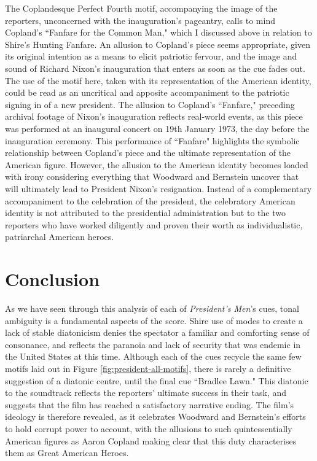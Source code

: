 The Coplandesque Perfect Fourth motif, accompanying the image of the reporters, unconcerned with the inauguration's pageantry, calls to mind Copland's ``Fanfare for the Common Man," which I discussed above in relation to Shire's Hunting Fanfare.
An allusion to Copland's piece seems appropriate, given its original intention as a means to elicit patriotic fervour, and the image and sound of Richard Nixon's inauguration that enters as soon as the cue fades out.
The use of the motif here, taken with its representation of the American identity, could be read as an uncritical and apposite accompaniment to the patriotic signing in of a new president.
The allusion to Copland's ``Fanfare," preceding archival footage of Nixon's inauguration reflects real-world events, as this piece was performed at an inaugural concert on 19th January 1973, the day before the inauguration ceremony.\autocites[Michael Chikinda has noted that before ``Fanfare for the Common Man" was confirmed to be performed, organisers considered a performance of another Copland piece, ``Lincoln Portrait." However, this other piece was rejected, likely due, Chikinda argues, to the piece's recitation of a portion of President Lincoln's Gettysburg Address in which he lamented the number of casualties in the American Civil War. Given that the Vietnam War was still ongoing, Chikinda writes that Lincoln's speech possibly ``touched a nerve."][7-8]{chikinda_lincoln_2018}
This performance of ``Fanfare" highlights the symbolic relationship between Copland's piece and the ultimate representation of the American figure.
However, the allusion to the American identity becomes loaded with irony considering everything that Woodward and Bernstein uncover that will ultimately lead to President Nixon's resignation.
Instead of a complementary accompaniment to the celebration of the president, the celebratory American identity is not attributed to the presidential administration but to the two reporters who have worked diligently and proven their worth as individualistic, patriarchal American heroes.

\section{Conclusion}

As we have seen through this analysis of each of \textit{President's Men}'s cues, tonal ambiguity is a fundamental aspects of the score.
Shire use of modes to create a lack of stable diatonicism denies the spectator a familiar and comforting sense of consonance, and reflects the paranoia and lack of security that was endemic in the United States at this time.
Although each of the cues recycle the same few motifs laid out in Figure \ref{fig:president-all-motifs}, there is rarely a definitive suggestion of a diatonic centre, until the final cue ``Bradlee Lawn."
This diatonic to the soundtrack reflects the reporters' ultimate success in their task, and suggests that the film has reached a satisfactory narrative ending.
The film's ideology is therefore revealed, as it celebrates Woodward and Bernstein's efforts to hold corrupt power to account, with the allusions to such quintessentially American figures as Aaron Copland making clear that this duty characterises them as Great American Heroes.

